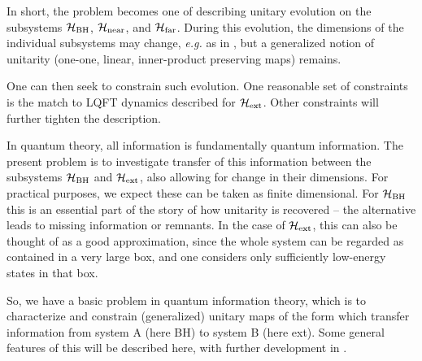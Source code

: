 In short, the problem becomes one of describing unitary evolution on the subsystems ${{\cal H}_{\rm BH}}$, ${{\cal H}_{\rm near}}$, and ${{\cal H}_{\rm far}}$.  During this evolution, the dimensions of the individual subsystems may change, {\it e.g.} as in \bhdim, but a generalized notion of unitarity (one-one, linear, inner-product preserving maps) remains.

One can then seek to constrain such evolution.  One reasonable set of constraints is the match to LQFT dynamics described for ${{\cal H}_{\rm ext}}$.  Other constraints will further tighten the description.




In quantum theory, all information is fundamentally quantum information.  The present problem is to investigate transfer of this information between the subsystems ${{\cal H}_{\rm BH}}$ and ${{\cal H}_{\rm ext}}$, also allowing for change in their dimensions.   For practical purposes, we expect these can be taken as finite dimensional.  For ${{\cal H}_{\rm BH}}$ this is an essential part of the story of how unitarity is recovered -- the alternative leads to missing information or remnants.  In the case of ${{\cal H}_{\rm ext}}$, this can also be thought of as a good approximation, since the whole system can be regarded as contained in a very large box, and one considers only sufficiently low-energy states in that box.

So, we have a basic problem in quantum information theory, which is to characterize and constrain (generalized) unitary maps of the form
%
\eqn{}
%
which transfer information from system A (here BH) to system B (here ext).  Some general features of this will be described here, with further development in .

